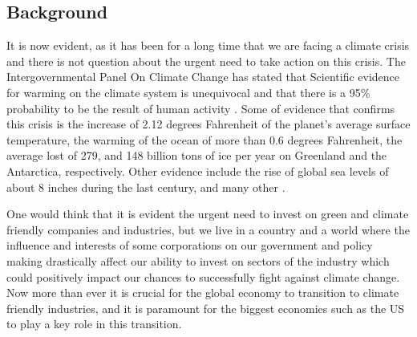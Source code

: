 \documentclass[sigconf, nonacm]{acmart}
\begin{document}
\subsection{Background}
\begin{flushleft}
It is now evident, as it has been for a long time that we are facing a climate crisis and there is not question about the urgent need to take action on this crisis. The Intergovernmental Panel On Climate Change has stated that Scientific evidence for warming on the climate system is unequivocal and that there is a 95\% probability to be the result of human activity \cite{nasa_2021}.  Some of evidence that confirms this crisis is the increase of 2.12 degrees Fahrenheit  of the planet's average surface temperature, the warming of the ocean of more than 0.6 degrees Fahrenheit, the average lost of 279, and 148 billion tons of ice per year on Greenland and the Antarctica, respectively. Other evidence include the rise of global sea levels of about 8 inches during the last century, and many other  \cite{nasa_2021}.
\end{flushleft}

\begin{flushleft}
One would think that it is evident the urgent need to invest on green and climate friendly companies and industries, but we live in a country and a world where the influence and interests of some corporations on our government and policy making drastically affect our ability to invest on sectors of the industry which could positively impact our chances to successfully fight against climate change. Now more than ever it is crucial for the global economy to transition to climate friendly industries, and it is paramount for the biggest economies such as the US to play a key role in this transition. 
\end{flushleft}


\end{document}
